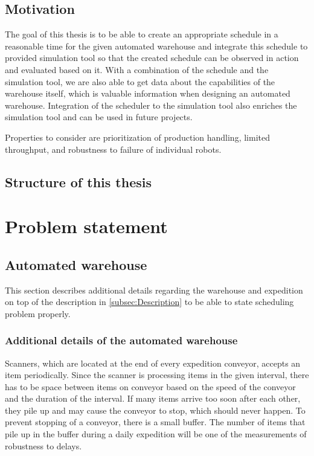 \documentclass{ctuthesis}
\begin{document}
\section{Motivation}

The goal of this thesis is to be able to create an appropriate schedule in a reasonable time for the given automated warehouse and integrate this schedule to provided simulation tool so that the created schedule can be observed in action and evaluated based on it. With a combination of the schedule and the simulation tool, we are also able to get data about the capabilities of the warehouse itself, which is valuable information when designing an automated warehouse. Integration of the scheduler to the simulation tool also enriches the simulation tool and can be used in future projects.

Properties to consider are prioritization of production handling, limited throughput, and robustness to failure of individual robots. 

\section{Structure of this thesis}



\chapter{Problem statement}
\section{Automated warehouse}
\label{sec:Automated warehouse}

This section describes additional details regarding the warehouse and expedition on top of the description in \ref{subsec:Description} to be able to state scheduling problem properly.

\subsection{Additional details of the automated warehouse}


Scanners, which are located at the end of every expedition conveyor, accepts an item periodically. Since the scanner is processing items in the given interval, there has to be space between items on conveyor based on the speed of the conveyor and the duration of the interval. If many items arrive too soon after each other, they pile up and may cause the conveyor to stop, which should never happen. To prevent stopping of a conveyor, there is a small buffer. The number of items that pile up in the buffer during a daily expedition will be one of the measurements of robustness to delays.
\end{document}
